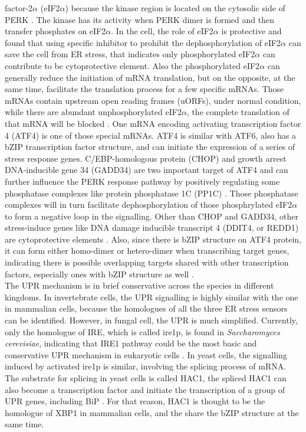 factor-2$\alpha$ (eIF2$\alpha$) because the kinase region is located on the cytosolic side of PERK \citep{harding1999erratum}. The kinase has its activity when PERK dimer is formed and then transfer phosphates on eIF2$\alpha$. In the cell, the role of eIF2$\alpha$ is protective and \citet{boyce2005selective} found that using specific inhibitor to prohibit the dephosphorylation of eIF2$\alpha$ can save the cell from ER stress, that indicates only phosphorylated eIF2$\alpha$ can contribute to be cytoprotective element. Also the phosphorylated eIF2$\alpha$ can generally reduce the initiation of mRNA translation, but on the opposite, at the same time, facilitate the translation process for a few specific mRNAs. Those mRNAs contain upstream open reading frames (uORFs), under normal condition, while there are abundant unphosphorylated eIF2$\alpha$, the complete translation of that mRNA will be blocked \citep{baird2012eukaryotic}. One mRNA encoding activating transcription factor 4 (ATF4) is one of those special mRNAs. ATF4 is similar with ATF6, also has a bZIP transcription factor structure, and can initiate the expression of a series of stress response genes. C/EBP-homologous protein (CHOP) and growth arrest DNA-inducible gene 34 (GADD34) are two important target of ATF4 and can further influence the PERK response pathway by positively regulating some phosphatase complexes like protein phosphatase 1C (PP1C) \citep{harding2003integrated,novoa2001feedback}. Those phosphatase complexes will in turn facilitate dephosphorylation of those phosphrylated eIF2$\alpha$ to form a negative loop in the signalling. Other than CHOP and GADD34, other stress-induce genes like DNA damage inducible transcript 4 (DDIT4, or REDD1) are cytoprotective elements \citep{whitney2009atf4}. Also, since there is bZIP structure on ATF4 protein, it can form either homo-dimer or hetero-dimer when transcribing target genes, indicating there is possible overlapping targets shared with other transcription factors, especially ones with bZIP structure as well \citep{hai1989transcription}.\\
The UPR mechanism is in brief conservative across the species in different kingdoms. In invertebrate cells, the UPR signalling is highly similar with the one in mammalian cells, because the homologues of all the three ER stress sensors can be identified. However, in fungal cell, the UPR is much simplified. Currently, only the homologue of IRE, which is called ire1p, is found in \textit{Saccharomyces cerevisiae}, indicating that IRE1 pathway could be the most basic and conservative UPR mechanism in eukaryotic cells \citep{patil2001intracellular}. In yeast cells, the signalling induced by activated ire1p is similar, involving the splicing process of mRNA. The substrate for splicing in yeast cells is called HAC1, the spliced HAC1 can also become a transcription factor and initiate the transcription of a group of UPR genes, including BiP \citep{foti1999conservation}. For that reason, HAC1 is thought to be the homologue of XBP1 in mammalian cells, and the share the bZIP structure at the same time. \\
